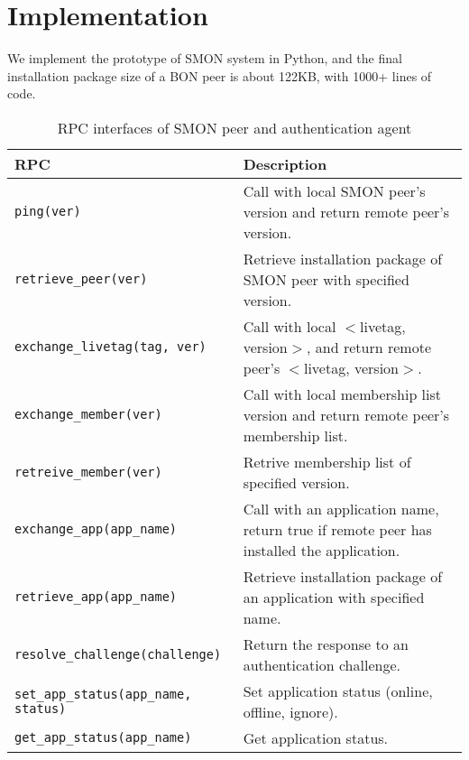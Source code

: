 \section{Implementation}
\label{sec:impl}

We implement the prototype of SMON system in Python, and the
final installation package size of a BON peer is about
122KB, with 1000+ lines of code.

\begin{table*}
\small
\centering
\begin{tabular}{|l|l|}

\hline
\textbf{RPC} & \textbf{Description} \\

\hline
\texttt{ping(ver)} & Call with local SMON peer's version and
return remote peer's version.\\

\hline
\texttt{retrieve\_peer(ver)} & Retrieve installation package
of SMON peer with specified version.\\

\hline
\texttt{exchange\_livetag(tag, ver)} & Call with local
$<$livetag, version$>$, and return remote peer's $<$livetag,
version$>$.\\

\hline
\texttt{exchange\_member(ver)} & Call with local membership
list version and return remote peer's membership list.\\

\hline
\texttt{retreive\_member(ver)} & Retrive membership list of
specified version.\\

\hline
\texttt{exchange\_app(app\_name)} & Call with an application
name, return true if remote peer has installed the
application.\\

\hline
\texttt{retrieve\_app(app\_name)} & Retrieve installation package
of an application with specified name.\\

\hline
\texttt{resolve\_challenge(challenge)} & Return the response
to an authentication challenge.\\

\hline
\texttt{set\_app\_status(app\_name, status)} & Set application status (online,
offline, ignore).\\

\hline
\texttt{get\_app\_status(app\_name)} & Get application status. \\

\hline

\end{tabular}
\caption{RPC interfaces of SMON peer and authentication
agent}
\label{fig:rpc}
\end{table*}

